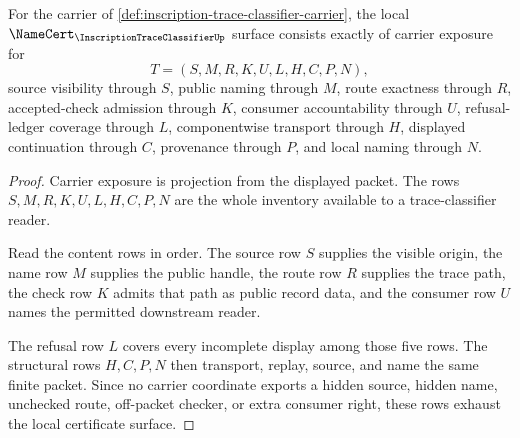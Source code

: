 \begin{theorem}
\label{thm:inscription-trace-classifier-obligations}
For the carrier of \autoref{def:inscription-trace-classifier-carrier}, the local $\NameCert_{\InscriptionTraceClassifierUp}$ surface consists exactly of carrier exposure for
$$
T=(S,M,R,K,U,L,H,C,P,N),
$$
source visibility through $S$, public naming through $M$, route exactness through $R$, accepted-check admission through $K$, consumer accountability through $U$, refusal-ledger coverage through $L$, componentwise transport through $H$, displayed continuation through $C$, provenance through $P$, and local naming through $N$.
\end{theorem}
\begin{proof}
Carrier exposure is projection from the displayed packet. The rows $S,M,R,K,U,L,H,C,P,N$ are the whole inventory available to a trace-classifier reader.

Read the content rows in order. The source row $S$ supplies the visible origin, the name row $M$ supplies the public handle, the route row $R$ supplies the trace path, the check row $K$ admits that path as public record data, and the consumer row $U$ names the permitted downstream reader.

The refusal row $L$ covers every incomplete display among those five rows. The structural rows $H,C,P,N$ then transport, replay, source, and name the same finite packet. Since no carrier coordinate exports a hidden source, hidden name, unchecked route, off-packet checker, or extra consumer right, these rows exhaust the local certificate surface.
\end{proof}



